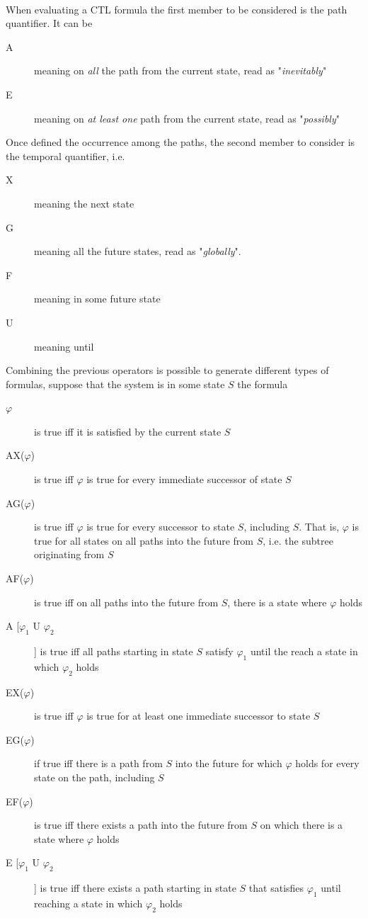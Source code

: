 \paragraph{} When evaluating a CTL formula the first member to be considered is the path quantifier. It can be
\begin{description}
\item[A] meaning on \textit{all} the path from the current state, read as "\textit{inevitably}"
\item[E] meaning on \textit{at least one} path from the current state, read as "\textit{possibly}"
\end{description}
Once defined the occurrence among the paths, the second member to consider is the temporal quantifier, i.e.
\begin{description}
\item[X] meaning the next state
\item[G] meaning all the future states, read as "\textit{globally}".
\item[F] meaning in some future state
\item[U] meaning until
\end{description}
Combining the previous operators is possible to generate different types of formulas, suppose that the system is in some state $S$ the formula
\begin{description}
\item[$\varphi$] is true iff it is satisfied by the current state $S$
\item[AX($\varphi$)] is true iff $\varphi$ is true for every immediate successor of state $S$
\item[AG($\varphi$)] is true iff $\varphi$ is true for every successor to state $S$, including $S$. That is, $\varphi$ is true for all states on all paths into the future from $S$, i.e. the subtree originating from $S$
\item[AF($\varphi$)] is true iff on all paths into the future from $S$, there is a state where $\varphi$ holds
\item[A [$\varphi_1$ U $\varphi_2$]] is true iff all paths starting in state $S$ satisfy $\varphi_1$ until the reach a state in which $\varphi_2$ holds
\\
\item[EX($\varphi$)] is true iff $\varphi$ is true for at least one immediate successor to state $S$
\item[EG($\varphi$)]  if true iff there is a path from $S$ into the future for which $\varphi$ holds for every state on the path, including $S$
\item[EF($\varphi$)] is true iff there exists a path into the future from $S$ on which there is a state where $\varphi$ holds
\item[E [$\varphi_1$ U $\varphi_2$]] is true iff there exists a path starting in state $S$ that satisfies $\varphi_1$ until reaching a state in which $\varphi_2$ holds
\end{description}
